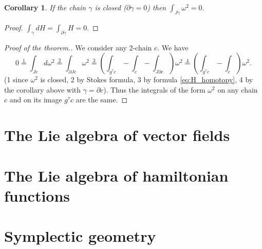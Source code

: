 \documentclass{book}
\numberwithin{equation}{section}
\theoremstyle{plain}
\newtheorem*{cor*}{Corollary}
\theoremstyle{definition}
\theoremstyle{remark}
\theoremstyle{remark}
\begin{document}
\begin{cor*}
  If the chain $\gamma$ is closed ($\partial \gamma = 0$)
  then $\int_{J\gamma} \omega^2 = 0$.

\end{cor*}

\begin{proof}
  $\int_\gamma dH = \int_{\partial \gamma} H = 0.$

\end{proof}

\begin{proof}[Proof of the theorem.]
  We consider any 2-chain $c$. We have
  $$
  0 \stackrel{1}{=} \int_{Jc} d\omega^2
  \stackrel{2}{=} \int_{\partial Jc} \omega^2
  \stackrel{3}{=}
  \left(
    \int_{g^\tau c}
    -\int_{c}
    -\int_{J\partial c}
  \right)
  \omega^2
  \stackrel{4}{=}
  \left(
    \int_{g^\tau c}
    -\int_{c}
  \right)
  \omega^2.
  $$
  (1 since $\omega^2$ is closed, 2 by Stokes formula,
  3 by formula \eqref{eq:H_homotopy},
  4 by the corollary above with $\gamma = \partial c$).
  Thus the integrals of the form $\omega^2$
  on any chain $c$ and on its image $g^\tau c$ are the same.
\end{proof}

\section{The Lie algebra of vector fields}

\section{The Lie algebra of hamiltonian functions}

\begin{figure}
  \centering
\end{figure}

\section{Symplectic geometry}
\end{document}
